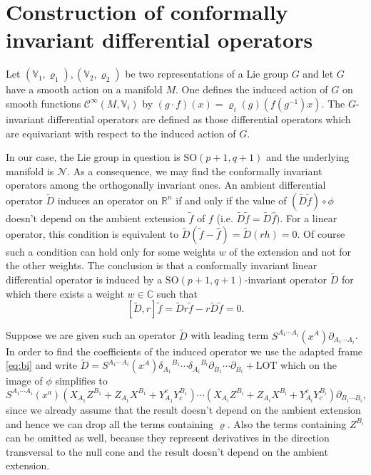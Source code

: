 \documentclass[final]{birkmult}
\theoremstyle{definition}
\theoremstyle{remark}
\numberwithin{equation}{section}
\newcommand{\p}[1]{\partial_{#1}}
\newcommand{\bi}[3][c]{X_{#2} Z^{#3} + Z_{#2} X^{#3} + Y_{#2}^{#1} Y^{#3}_{#1}}
\newcommand{\di}[2]{{\delta_{#1}}^{#2}}
\newcommand{\aSO}{\mathrm{SO}(p+1,q+1)}
\begin{document}
\section{Construction of conformally invariant differential operators}

 Let $(\mathbb{V}_1,\varrho_1), (\mathbb{V}_2,\varrho_2)$ be two representations of a Lie group $G$ and let $G$ have a smooth action on a manifold $M$. One defines the induced action of $G$ on smooth functions $\mathcal{C}^\infty(M,\mathbb{V}_i)$ by $(g\cdot f)(x) = \varrho_i(g)(f(g^{-1})x)$. The $G$-invariant differential operators are defined as those differential operators which are equivariant with respect to the induced action of $G$. 

 In our case, the Lie group in question is $\aSO$ and the underlying manifold is $\mathcal{N}$. As a consequence, we may find the conformally invariant operators among the orthogonally invariant ones. An ambient differential operator $\tilde{D}$ induces an operator on $\mathbb{R}^n$ if and only if the value of $(\tilde{D}\tilde{f})\circ \phi$ doesn't depend on the ambient extension $\tilde{f}$ of $f$ (i.e. $\tilde{D}\tilde{f} = \tilde{D}\hat{f})$. For a linear operator, this condition is equivalent to $\tilde{D}(\tilde{f}-\hat{f}) = \tilde{D} (rh) = 0$. Of course such a condition can hold only for some weights $w$ of the extension and not for the other weights. The conclusion is that a conformally invariant linear differential operator is induced by a $\aSO$-invariant operator $\tilde{D}$ for which there exists a weight $w\in\mathbb{C}$ such that
\[[\tilde{D},r]\tilde{f}= \tilde{D}r\tilde{f} - r \tilde{D}\tilde{f} = 0.\] %

 Suppose we are given such an operator $\tilde{D}$ with leading term $S^{A_1\cdots A_i}(x^A) \p{A_1\cdots A_i}$. In order to find the coefficients of the induced operator we use the adapted frame \eqref{eq:bi} and write $\tilde{D}=S^{A_1\cdots A_i}(x^A) \di{A_1}{B_1}\cdots\di{A_i}{B_i}\p{B_1}\cdots\p{B_i} + \text{LOT}$ which on the image of $\phi$ simplifies to 
 \[S^{A_1\cdots A_i}(x^a) (\bi{A_1}{B_1})\cdots(\bi{A_i}{B_i})\p{B_1 \cdots B_i},\]
 since we already assume that the result doesn't depend on the ambient extension and hence we can drop all the terms containing $\varrho$. Also the terms containing $Z^{B_i}$ can be omitted as well, because they represent derivatives in the direction transversal to the null cone and the result doesn't depend on the ambient extension.
\end{document}

